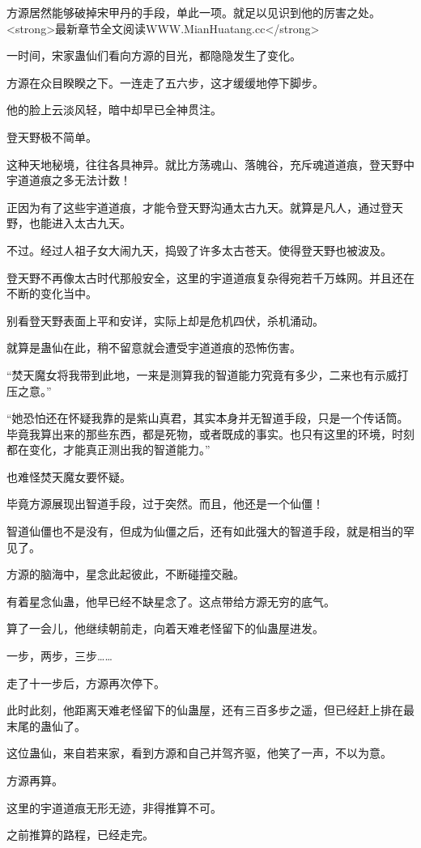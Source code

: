 \begin{this_body}
方源居然能够破掉宋甲丹的手段，单此一项。就足以见识到他的厉害之处。<strong>最新章节全文阅读WWW.MianHuatang.cc</strong>

一时间，宋家蛊仙们看向方源的目光，都隐隐发生了变化。

方源在众目睽睽之下。一连走了五六步，这才缓缓地停下脚步。

他的脸上云淡风轻，暗中却早已全神贯注。

登天野极不简单。

这种天地秘境，往往各具神异。就比方荡魂山、落魄谷，充斥魂道道痕，登天野中宇道道痕之多无法计数！

正因为有了这些宇道道痕，才能令登天野沟通太古九天。就算是凡人，通过登天野，也能进入太古九天。

不过。经过人祖子女大闹九天，捣毁了许多太古苍天。使得登天野也被波及。

登天野不再像太古时代那般安全，这里的宇道道痕复杂得宛若千万蛛网。并且还在不断的变化当中。

别看登天野表面上平和安详，实际上却是危机四伏，杀机涌动。

就算是蛊仙在此，稍不留意就会遭受宇道道痕的恐怖伤害。

“焚天魔女将我带到此地，一来是测算我的智道能力究竟有多少，二来也有示威打压之意。”

“她恐怕还在怀疑我靠的是紫山真君，其实本身并无智道手段，只是一个传话筒。毕竟我算出来的那些东西，都是死物，或者既成的事实。也只有这里的环境，时刻都在变化，才能真正测出我的智道能力。”

也难怪焚天魔女要怀疑。

毕竟方源展现出智道手段，过于突然。而且，他还是一个仙僵！

智道仙僵也不是没有，但成为仙僵之后，还有如此强大的智道手段，就是相当的罕见了。

方源的脑海中，星念此起彼此，不断碰撞交融。

有着星念仙蛊，他早已经不缺星念了。这点带给方源无穷的底气。

算了一会儿，他继续朝前走，向着天难老怪留下的仙蛊屋进发。

一步，两步，三步……

走了十一步后，方源再次停下。

此时此刻，他距离天难老怪留下的仙蛊屋，还有三百多步之遥，但已经赶上排在最末尾的蛊仙了。

这位蛊仙，来自若来家，看到方源和自己并驾齐驱，他笑了一声，不以为意。

方源再算。

这里的宇道道痕无形无迹，非得推算不可。

之前推算的路程，已经走完。


\end{this_body}
